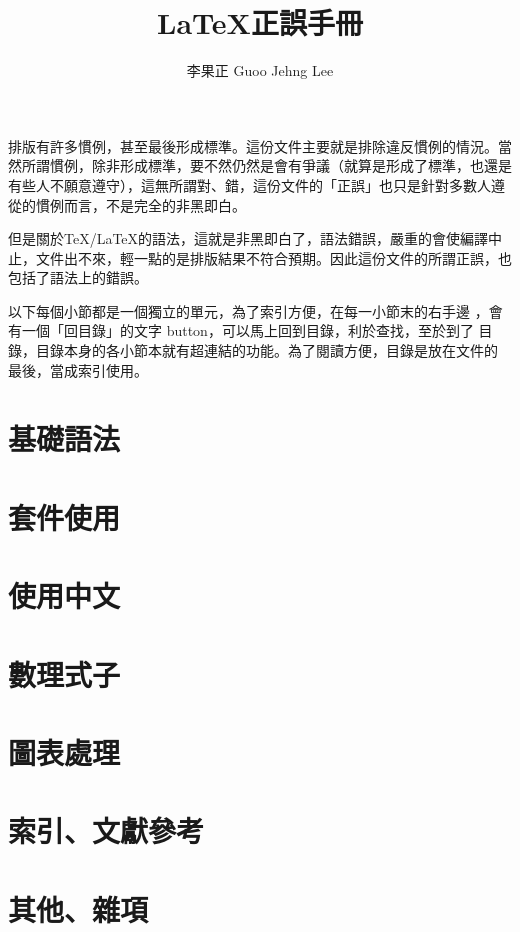 \documentclass[11pt,a4paper]{article}
\title{\textsf{\textbf{\LaTeX \iyan 正誤手冊}}}
\author{李果正 Guoo Jehng Lee}
\date{\zhtoday}
\begin{document}
\maketitle

排版有許多慣例，甚至最後形成標準。這份文件主要就是排除違反慣例的情況。當
然所謂慣例，除非形成標準，要不然仍然是會有爭議（就算是形成了標準，也還是
有些人不願意遵守），這無所謂對、錯，這份文件的「正誤」也只是針對多數人遵
從的慣例而言，不是完全的非黑即白。

但是關於\TeX/\LaTeX 的語法，這就是非黑即白了，語法錯誤，嚴重的會使編譯中
止，文件出不來，輕一點的是排版結果不符合預期。因此這份文件的所謂正誤，也
包括了語法上的錯誤。

以下每個小節都是一個獨立的單元，為了索引方便，在每一小節末的右手邊
，會有一個「回目錄」的文字 button，可以馬上回到目錄，利於查找，至於到了
目錄，目錄本身的各小節本就有超連結的功能。為了閱讀方便，目錄是放在文件的
最後，當成索引使用。

\section{基礎語法}
\label{sec:syntax}

  
  
  
  

\section{套件使用}
\label{sec:package}

  

\section{使用中文}
\label{sec:chinese}

\section{數理式子}
\label{sec:math}

  
  
  
  
  

\section{圖表處理}
\label{sec:figure}

\section{索引、文獻參考}
\label{sec:index}

\section{其他、雜項}
\label{sec:miscellaneous}

\clearpage
\hypertarget{contents}{}
\tableofcontents
\end{document}
